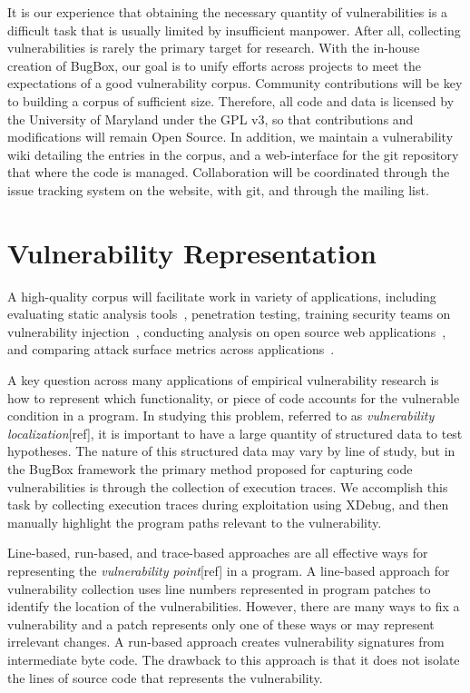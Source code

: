\documentclass[letterpaper,twocolumn,10pt]{article}
\begin{document}
It is our experience that obtaining the necessary quantity of vulnerabilities is a difficult task that is usually limited by insufficient manpower. After all, collecting vulnerabilities is rarely the primary target for research. With the in-house creation of BugBox, our goal is to unify efforts across projects to meet the expectations of a good vulnerability corpus. Community contributions will be key to building a corpus of sufficient size. Therefore, all code and data is licensed by the University of Maryland under the GPL v3, so that contributions and modifications will remain Open Source. In addition, we maintain a vulnerability wiki detailing the entries in the corpus, and a web-interface for the git repository that where the code is managed. Collaboration will be coordinated through the issue tracking system on the website, with git, and through the mailing list. \par

\section{Vulnerability Representation}

A high-quality corpus will facilitate work in variety of applications, including evaluating static analysis tools~\cite{Zitser:2004:TSA:1041685.1029911}, penetration testing, training security teams on vulnerability injection~\cite{4725309}, conducting analysis on open source web applications~\cite{DBLP:journals/ese/HuynhM10}, and comparing attack surface metrics across applications~\cite{Stuckman:2012:CAA:2372225.2372229}. \par

A key question across many applications of empirical vulnerability research is how to represent which functionality, or piece of code accounts for the vulnerable condition in a program. In studying this problem, referred to as \emph{vulnerability localization}[ref], it is important to have a large quantity of structured data to test hypotheses. The nature of this structured data may vary by line of study, but in the BugBox framework the primary method proposed for capturing code vulnerabilities is through the collection of execution traces. We accomplish this task by collecting execution traces during exploitation using XDebug, and then manually highlight the program paths relevant to the vulnerability. \par
 
Line-based, run-based, and trace-based approaches are all effective ways for representing the \emph{vulnerability point}[ref] in a program.   A line-based\cite{4630094} approach for vulnerability collection uses line numbers represented in program patches to identify the location of the vulnerabilities.  However, there are many ways to fix a vulnerability and a patch represents only one of these ways or may represent irrelevant changes.  A run-based\cite{Song:2008:BNA:1496255.1496257} approach creates vulnerability signatures from intermediate byte code.  The drawback to this approach is that it does not isolate the lines of source code that represents the vulnerability.
  
\end{document}
